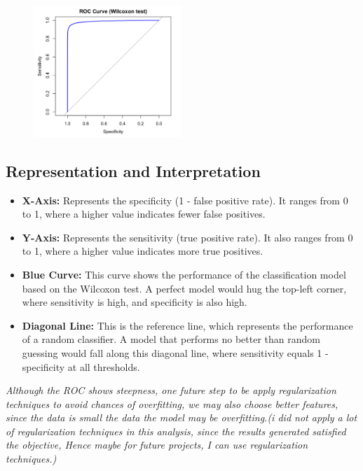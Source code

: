 \documentclass[12pt]{article}
\begin{document}
\begin{figure}[h]
  \centering
  \includegraphics[width=0.5\textwidth]{figure/roc.png}  %
\end{figure}

\subsection*{Representation and Interpretation}
\begin{itemize}
  \item \textbf{X-Axis:} Represents the specificity (1 - false positive rate). It ranges from 0 to 1, where a higher value indicates fewer false positives.
  \item \textbf{Y-Axis:} Represents the sensitivity (true positive rate). It also ranges from 0 to 1, where a higher value indicates more true positives.
  \item \textbf{Blue Curve:} This curve shows the performance of the classification model based on the Wilcoxon test. A perfect model would hug the top-left corner, where sensitivity is high, and specificity is also high.
  \item \textbf{Diagonal Line:} This is the reference line, which represents the performance of a random classifier. A model that performs no better than random guessing would fall along this diagonal line, where sensitivity equals 1 - specificity at all thresholds.
\end{itemize}

\textit{Although the ROC shows steepness, one future step to be apply regularization techniques to avoid chances of overfitting, we may also choose better features, since the data is small the data the model may be overfitting.(i did not apply a lot of regularization techniques in this analysis, since the results generated satisfied the objective, Hence maybe for future projects, I can use regularization techniques.)}
\end{document}

